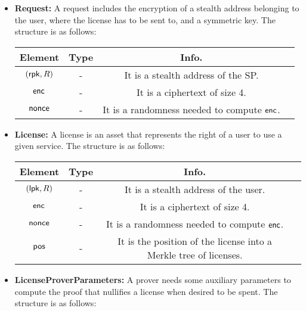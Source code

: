 \begin{itemize}
    \item \textbf{Request:} A request includes the encryption of a stealth address belonging to the user, where the license has to be sent to, and a symmetric key. The structure is as follows:

    \begin{center}
        \begin{tabular}{ |c|c|c|c| } 
        \hline
        \textbf{Element} & \textbf{Type} & \textbf{Info.} \\
        \hline
        $(\mathsf{rpk}, R)$ & - & It is a stealth address of the SP. \\
        $\mathsf{enc}$ & - & It is a ciphertext of size 4. \\
        $\mathsf{nonce}$ & - & It is a randomness needed to compute $\mathsf{enc}$. \\ 
        \hline
        \end{tabular}
    \end{center}


    \item \textbf{License:} A license is an asset that represents the right of a user to use a given service. The structure is as follows:

    \begin{center}
        \begin{tabular}{ |c|c|c|c| } 
        \hline
        \textbf{Element} & \textbf{Type} & \textbf{Info.} \\
        \hline
        $(\mathsf{lpk}, R)$ & - & It is a stealth address of the user. \\
        $\mathsf{enc}$ & - & It is a ciphertext of size 4. \\
        $\mathsf{nonce}$ & - & It is a randomness needed to compute $\mathsf{enc}$. \\ 
        $\mathsf{pos}$ & - & It is the position of the license into a Merkle tree of licenses. \\ 
        \hline
        \end{tabular}
    \end{center}

    \item \textbf{LicenseProverParameters:} A prover needs some auxiliary parameters to compute the proof that nullifies a license when desired to be spent. The structure is as follows:


\end{itemize}
